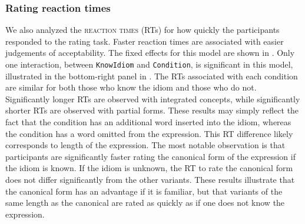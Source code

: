 \documentclass[output=paper
,modfonts
,nonflat]{langsci/langscibook}
\begin{document}
\subsubsection{Rating reaction times}

We also analyzed the \textsc{reaction times} (RTs) for how quickly the participants responded to the  rating task. Faster reaction times are associated with easier judgements of acceptability. The fixed effects for this model are shown in . Only one interaction, between \texttt{KnowIdiom} and \texttt{Condition}, is significant in this model, illustrated in the bottom-right panel in . The RTs associated with each condition are similar for both those who know the idiom and those who do not. Significantly longer RTs are observed with integrated concepts, while significantly shorter RTs are observed with partial forms. These results may simply reflect the fact that the  condition has an additional word inserted into the idiom, whereas the  condition has a word omitted from the expression. This RT difference likely corresponds to length of the expression. The most notable observation is that participants are significantly faster rating the canonical form of the expression if the idiom  is known. If the idiom is unknown, the RT to rate the canonical form does not differ significantly from the other variants. These results illustrate that the canonical form has an advantage if it is familiar, but that variants  of the same length as the canonical are rated as quickly as if one does not know the expression.\\ 
\end{document}
